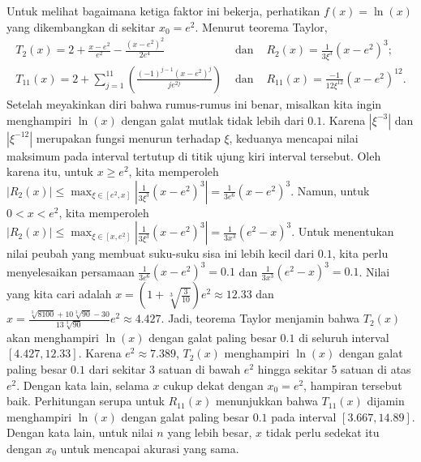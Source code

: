 Untuk melihat bagaimana ketiga faktor ini bekerja, perhatikan $f(x)=\ln(x)$
yang dikembangkan di sekitar $x_{0}=e^{2}$. Menurut teorema Taylor,
\begin{eqnarray*}
T_{2}(x)=2+\frac{x-e^{2}}{e^{2}}-\frac{(x-e^{2})^{2}}{2e^{4}} & \mbox{ dan } & R_{2}(x)=\frac{1}{3\xi^{3}}(x-e^{2})^{3};\\
T_{11}(x)=2+\sum_{j=1}^{11}\left(\frac{(-1)^{j-1}(x-e^{2})^{j}}{je^{2j}}\right) & \mbox{ dan } & R_{11}(x)=\frac{-1}{12\xi^{12}}(x-e^{2})^{12}.
\end{eqnarray*}
Setelah meyakinkan diri bahwa rumus-rumus ini benar, misalkan kita
ingin menghampiri $\ln(x)$ dengan galat mutlak tidak lebih dari $0.1$.
Karena $|\xi^{-3}|$ dan $|\xi^{-12}|$ merupakan fungsi menurun terhadap
$\xi$, keduanya mencapai nilai maksimum pada interval tertutup di
titik ujung kiri interval tersebut. Oleh karena itu, untuk $x\geq e^{2}$,
kita memperoleh $|R_{2}(x)|\leq\max_{\xi\in[e^{2},x]}\left|\frac{1}{3\xi^{3}}(x-e^{2})^{3}\right|=\frac{1}{3e^{6}}(x-e^{2})^{3}$.
Namun, untuk $0<x<e^{2}$, kita memperoleh $|R_{2}(x)|\leq\max_{\xi\in[x,e^{2}]}\left|\frac{1}{3\xi^{3}}(x-e^{2})^{3}\right|=\frac{1}{3x^{3}}(e^{2}-x)^{3}$.
Untuk menentukan nilai peubah yang membuat suku-suku sisa ini lebih
kecil dari $0.1$, kita perlu menyelesaikan persamaan $\frac{1}{3e^{6}}(x-e^{2})^{3}=0.1$
dan $\frac{1}{3x^{3}}(e^{2}-x)^{3}=0.1$. Nilai yang kita cari adalah
$x=\left(1+\sqrt[3]{\frac{3}{10}}\right)e^{2}\approx12.33$ dan $x=\frac{\sqrt[3]{8100}+10\sqrt[3]{90}-30}{13\sqrt[3]{90}}e^{2}\approx4.427$.
Jadi, teorema Taylor menjamin bahwa $T_{2}(x)$ akan menghampiri $\ln(x)$
dengan galat paling besar $0.1$ di seluruh interval $[4.427,12.33]$.
Karena $e^{2}\approx7.389$, $T_{2}(x)$ menghampiri $\ln(x)$ dengan
galat paling besar $0.1$ dari sekitar 3 satuan di bawah $e^{2}$
hingga sekitar 5 satuan di atas $e^{2}$. Dengan kata lain, selama
$x$ cukup dekat dengan $x_{0}=e^{2}$, hampiran tersebut baik. Perhitungan
serupa untuk $R_{11}(x)$ menunjukkan bahwa $T_{11}(x)$ dijamin menghampiri
$\ln(x)$ dengan galat paling besar $0.1$ pada interval $[3.667,14.89]$.
Dengan kata lain, untuk nilai $n$ yang lebih besar, $x$ tidak perlu
sedekat itu dengan $x_{0}$ untuk mencapai akurasi yang sama.

